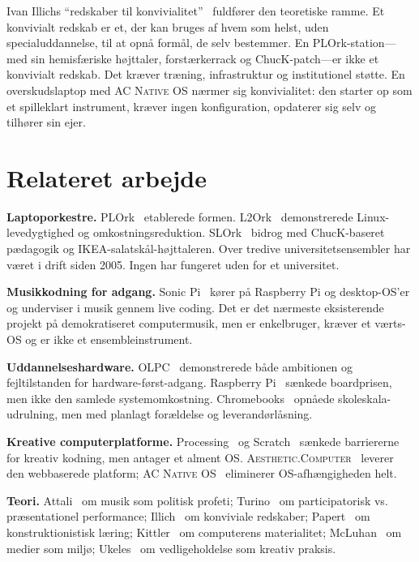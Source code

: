 \documentclass[10pt,letterpaper,twocolumn]{article}
\newcommand{\ac}{\textsc{Aesthetic.Computer}}
\newcommand{\acos}{\textsc{AC Native OS}}
\begin{document}
Ivan Illichs ``redskaber til konvivialitet''~\citep{illich1973tools} fuldf{\o}rer den teoretiske ramme. Et konvivialt redskab er et, der kan bruges af hvem som helst, uden specialuddannelse, til at opn{\aa} form{\aa}l, de selv bestemmer. En PLOrk-station---med sin hemisf{\ae}riske h{\o}jttaler, forst{\ae}rkerrack og ChucK-patch---er ikke et konvivialt redskab. Det kr{\ae}ver tr{\ae}ning, infrastruktur og institutionel st{\o}tte. En overskudslaptop med \acos{} n{\ae}rmer sig konvivialitet: den starter op som et spilleklart instrument, kr{\ae}ver ingen konfiguration, opdaterer sig selv og tilh{\o}rer sin ejer.


\section{Relateret arbejde}
\label{sec:related}

\textbf{Laptoporkestre.} PLOrk~\citep{trueman2006plork} etablerede formen. L2Ork~\citep{bukvic2010l2ork} demonstrerede Linux-levedygtighed og omkostningsreduktion. SLOrk~\citep{wang2009designing} bidrog med ChucK-baseret p{\ae}dagogik og IKEA-salatsk{\aa}l-h{\o}jttaleren. Over tredive universitetsensembler har v{\ae}ret i drift siden 2005. Ingen har fungeret uden for et universitet.

\textbf{Musikkodning for adgang.} Sonic Pi~\citep{aaron2016sonic} k{\o}rer p{\aa} Raspberry Pi og desktop-OS'er og underviser i musik gennem live coding. Det er det n{\ae}rmeste eksisterende projekt p{\aa} demokratiseret computermusik, men er enkelbruger, kr{\ae}ver et v{\ae}rts-OS og er ikke et ensembleinstrument.

\textbf{Uddannelseshardware.} OLPC~\citep{negroponte1995being, kraemer2009olpc} demonstrerede b{\aa}de ambitionen og fejltilstanden for hardware-f{\o}rst-adgang. Raspberry Pi~\citep{raspberry2012} sænkede boardprisen, men ikke den samlede systemomkostning. Chromebooks~\citep{pirg2023chromebook} opn{\aa}ede skoleskala-udrulning, men med planlagt for{\ae}ldelse og leverand{\o}rl{\aa}sning.

\textbf{Kreative computerplatforme.} Processing~\citep{reas2007processing} og Scratch~\citep{resnick2009scratch} s{\ae}nkede barriererne for kreativ kodning, men antager et alment OS. \ac{}~\citep{scudder2026ac} leverer den webbaserede platform; \acos{}~\citep{scudder2026os} eliminerer OS-afh{\ae}ngigheden helt.

\textbf{Teori.} Attali~\citep{attali1985noise} om musik som politisk profeti; Turino~\citep{turino2008music} om participatorisk vs. pr{\ae}sentationel performance; Illich~\citep{illich1973tools} om konviviale redskaber; Papert~\citep{papert1980mindstorms} om konstruktionistisk l{\ae}ring; Kittler~\citep{kittler1995no} om computerens materialitet; McLuhan~\citep{mcluhan1964understanding} om medier som milj{\o}; Ukeles~\citep{ukeles1969manifesto} om vedligeholdelse som kreativ praksis.
\end{document}
